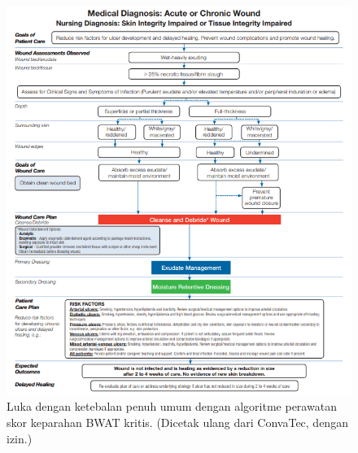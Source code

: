 \begin{figure}[H]
	\centering
	\includegraphics[keepaspectratio, width=14cm]{gambar/gambar_26}
	\caption{Luka dengan ketebalan penuh umum dengan algoritme perawatan skor keparahan BWAT kritis. (Dicetak ulang dari ConvaTec, dengan izin.) \citep{sussman2012}}
	\label{gambar:gambar_26}
\end{figure}

